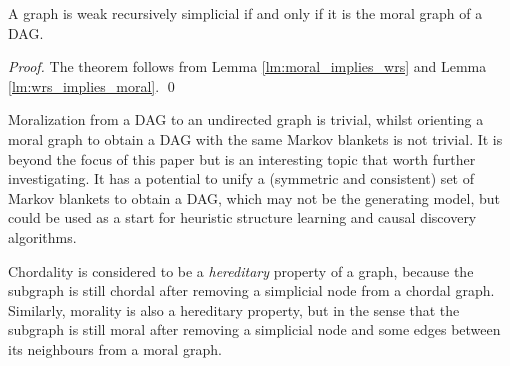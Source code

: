 \begin{theorem}
\label{thm:wrs_equal_moral}
A graph is weak recursively simplicial if and only if it is the moral graph of a DAG. 
\end{theorem}
\begin{proof}
The theorem follows from Lemma \ref{lm:moral_implies_wrs} and Lemma \ref{lm:wrs_implies_moral}. \qed
\end{proof}
Moralization from a DAG to an undirected graph is trivial, whilst orienting a moral graph to obtain a DAG with the same Markov blankets is not trivial. It is beyond the focus of this paper but is an interesting topic that worth further investigating. It has a potential to unify a (symmetric and consistent) set of Markov blankets to obtain a DAG, which may not be the generating model, but could be used as a start for heuristic structure learning and causal discovery algorithms. 

Chordality is considered to be a \textit{hereditary} property of a graph, because the subgraph is still chordal after removing a simplicial node from a chordal graph. Similarly, morality is also a hereditary property, but in the sense that the subgraph is still moral after removing a simplicial node and some edges between its neighbours from a moral graph. 

\iffalse
\begin{corollary}
Let $\mathcal{F}=\{F=(V,E) \mid F \text{ is weak recursively simplicial}\}$ be the set of weak recursively simplicial graphs over $V$ and $\mathcal{B} = \{B_V^G \mid \text{for all DAG $G$ over $V$}\}$ be the set of Markov blanket families of any DAG over $V$. Then $|\mathcal{F}| = |\mathcal{B}|$. 
\end{corollary}
\begin{proof}
It is straightforward that there is a one-to-one correspondence between $\mathcal{B}$ and moral graphs. Hence, Corollary \ref{cor:wrs_equal_moral} implies that $\mathcal{F}$ has a one-to-one correspondence with $\mathcal{B}$, so equal cardinality. \qed
\end{proof}
\fi

